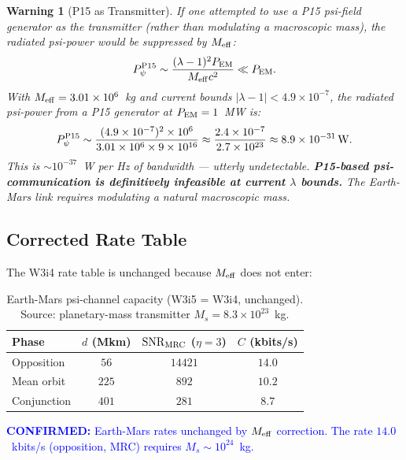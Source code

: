 \documentclass[aps,prd,twocolumn,superscriptaddress,nofootinbib]{revtex4-2}
\newcommand{\SNR}{\mathrm{SNR}}
\newcommand{\confirmed}[1]{\textcolor{blue}{\textbf{CONFIRMED:} #1}}
\newtheorem{warning}{Warning}
\begin{document}
\begin{warning}[P15 as Transmitter]
\label{warn:p15-tx}
If one attempted to use a P15 psi-field generator as the transmitter
(rather than modulating a macroscopic mass), the radiated psi-power
would be suppressed by $M_{\rm eff}$:
\begin{equation}
P_\psi^{\rm P15} \sim \frac{(\lambda-1)^2 P_{\rm EM}}{M_{\rm eff} c^2}
\ll P_{\rm EM}.
\label{eq:P15-power}
\end{equation}
With $M_{\rm eff} = 3.01\times10^6$~kg and current bounds
$|\lambda-1| < 4.9\times10^{-7}$, the radiated psi-power from a P15
generator at $P_{\rm EM} = 1$~MW is:
\begin{equation}
P_\psi^{\rm P15} \sim \frac{(4.9\times10^{-7})^2 \times 10^6}
{3.01\times10^6 \times 9\times10^{16}}
\approx \frac{2.4\times10^{-7}}{2.7\times10^{23}}
\approx 8.9\times10^{-31}\,\mathrm{W}.
\end{equation}
This is $\sim 10^{-37}$~W per Hz of bandwidth --- utterly undetectable.
\textbf{P15-based psi-communication is definitively infeasible at current
$\lambda$ bounds.} The Earth-Mars link requires modulating a natural
macroscopic mass.
\end{warning}

\subsection{Corrected Rate Table}

The W3i4 rate table is unchanged because $M_{\rm eff}$ does not enter:

\begin{table}[h]
\centering
\caption{Earth-Mars psi-channel capacity (W3i5 = W3i4, unchanged).
Source: planetary-mass transmitter $M_s = 8.3\times10^{23}$~kg.}
\begin{tabular}{lccc}
\hline\hline
Phase & $d$ (Mkm) & $\SNR_{\rm MRC}$ ($\eta=3$) & $C$ (kbits/s) \\
\hline
Opposition & $56$ & $14421$ & $14.0$ \\
Mean orbit & $225$ & $892$ & $10.2$ \\
Conjunction & $401$ & $281$ & $8.7$ \\
\hline\hline
\end{tabular}
\label{tab:earth-mars}
\end{table}

\confirmed{Earth-Mars rates unchanged by $M_{\rm eff}$ correction.
The rate $14.0$~kbits/s (opposition, MRC) requires $M_s \sim 10^{24}$~kg.}
\end{document}
